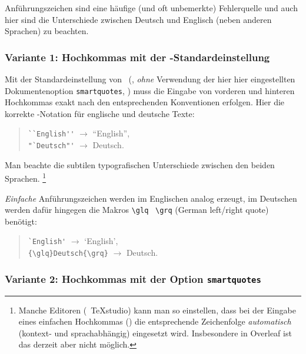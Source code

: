 Anführungszeichen sind eine häufige (und oft unbemerkte) Fehlerquelle und auch hier sind die Unterschiede zwischen Deutsch und Englisch (neben anderen Sprachen) zu beachten.


\subsubsection{Variante 1: Hochkommas mit der \latex-Standardeinstellung}

Mit der Standardeinstellung von \latex\ (\dah, \emph{ohne} Verwendung der 
hier hier eingestellten Dokumentenoption \texttt{\texttt{smartquotes}}, \su)
muss die Eingabe von vorderen und hinteren Hochkommas exakt nach den entsprechenden
Konventionen erfolgen.
Hier die korrekte \latex-Notation für englische und deutsche Texte:
%
\begin{quote}
\verb!``English''! $\rightarrow$ ``English'',\\
\verb!"`Deutsch"'! $\rightarrow$ {\glqq}Deutsch{\grqq}.
\end{quote}
%
Man beachte die subtilen typografischen Unterschiede zwischen den beiden Sprachen.%
\footnote{Manche Editoren (\zB\ \textsf{TeXstudio}) kann man so einstellen, dass
bei der Eingabe eines einfachen Hochkommas (\texttt{\textquotedbl}) die entsprechende Zeichenfolge 
\emph{automatisch} (kontext- und sprachabhängig) eingesetzt wird.
Insbesondere in \textsf{Overleaf} ist das derzeit aber nicht möglich.}

\emph{Einfache} Anführungszeichen werden im Englischen analog erzeugt, 
im Deutschen werden dafür hingegen die Makros \verb!\glq! \bzw\ \verb!\grq! 
(German left/right quote) benötigt:
%
\begin{quote}
\verb!`English'! $\rightarrow$ `English',\\
\verb!{\glq}Deutsch{\grq}! $\rightarrow$ {\glq}Deutsch{\grq}.
\end{quote}


\subsubsection{Variante 2: Hochkommas mit der Option \texttt{\bfseries smartquotes}}

